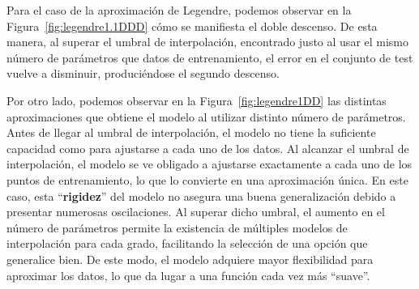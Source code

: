 Para el caso de la aproximación de Legendre, podemos observar en la Figura~\ref{fig:legendre1.1DDD} cómo se manifiesta el doble descenso. De esta manera, al superar el umbral de interpolación, encontrado justo al usar el mismo número de parámetros que datos de entrenamiento, el error en el conjunto de test vuelve a disminuir, produciéndose el segundo descenso.

Por otro lado, podemos observar en la Figura~\ref{fig:legendre1DD} las distintas aproximaciones que obtiene el modelo al utilizar distinto número de parámetros. Antes de llegar al umbral de interpolación, el modelo no tiene la suficiente capacidad como para ajustarse a cada uno de los datos. Al alcanzar el umbral de interpolación, el modelo se ve obligado a ajustarse exactamente a cada uno de los puntos de entrenamiento, lo que lo convierte en una aproximación única. En este caso, esta ``\textbf{rigidez}'' del modelo no asegura una buena generalización debido a presentar numerosas oscilaciones. Al superar dicho umbral, el aumento en el número de parámetros permite la existencia de múltiples modelos de interpolación para cada grado, facilitando la selección de una opción que generalice bien. De este modo, el modelo adquiere mayor flexibilidad para aproximar los datos, lo que da lugar a una función cada vez más ``suave''.

